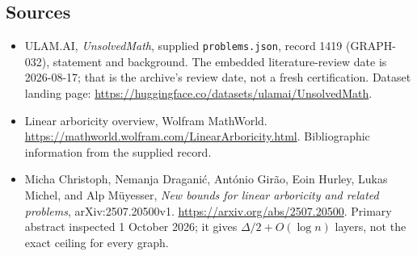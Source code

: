 \documentclass[11pt,a4paper]{article}
\begin{document}
\subsection{Sources}

{\small

\begin{itemize}

\item[\hypertarget{source:1419:1}{S1}] ULAM.AI, \emph{UnsolvedMath}, supplied \texttt{problems.json}, record 1419 (GRAPH-032), statement and background. The embedded literature-review date is 2026-08-17; that is the archive’s review date, not a fresh certification. Dataset landing page: \url{https://huggingface.co/datasets/ulamai/UnsolvedMath}.

\item[\hypertarget{source:1419:2}{S2}] Linear arboricity overview, Wolfram MathWorld. \url{https://mathworld.wolfram.com/LinearArboricity.html}. Bibliographic information from the supplied record.


\item[E1] Micha Christoph, Nemanja Dragani\'c,
Ant\'onio Gir\~ao, Eoin Hurley, Lukas Michel, and Alp M\"uyesser,
\emph{New bounds for linear arboricity and related problems},
arXiv:2507.20500v1. \url{https://arxiv.org/abs/2507.20500}.
Primary abstract inspected 1 October 2026; it gives
$\Delta/2+O(\log n)$ layers, not the exact ceiling for every graph.

\end{itemize}

}

\label{end:1419}
\end{document}

